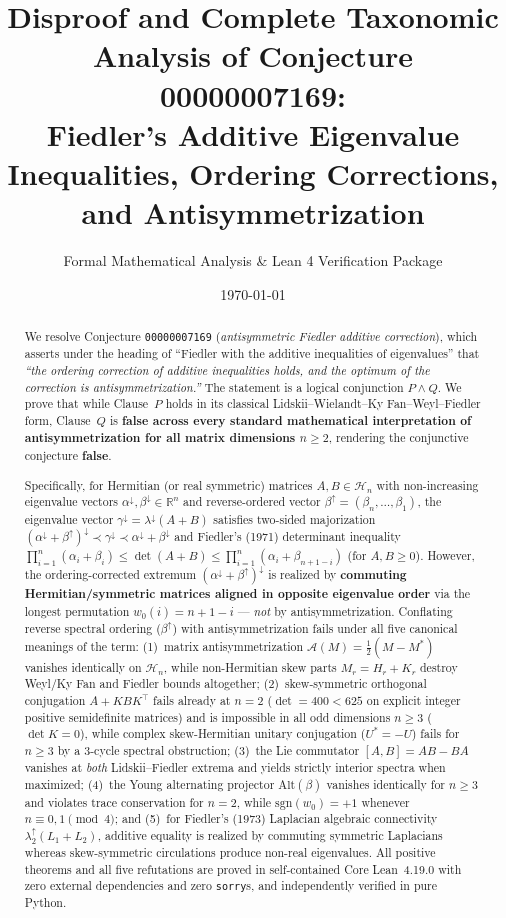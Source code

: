 \documentclass[11pt,a4paper]{article}
\title{\textbf{Disproof and Complete Taxonomic Analysis of Conjecture 00000007169:\\
Fiedler's Additive Eigenvalue Inequalities, Ordering Corrections,\\
and Antisymmetrization}}
\author{Formal Mathematical Analysis \& Lean 4 Verification Package}
\date{\today}
\theoremstyle{plain}
\theoremstyle{definition}
\newcommand{\R}{\mathbb{R}}
\newcommand{\Herm}{\mathcal{H}}
\newcommand{\Ap}{\mathcal{A}}
\newcommand{\Alt}{\mathrm{Alt}}
\begin{document}
\maketitle

\begin{abstract}
We resolve Conjecture \texttt{00000007169} (\emph{antisymmetric Fiedler additive correction}), which asserts under the heading of ``Fiedler with the additive inequalities of eigenvalues'' that \emph{``the ordering correction of additive inequalities holds, and the optimum of the correction is antisymmetrization.''} The statement is a logical conjunction $P \wedge Q$. We prove that while Clause~$P$ holds in its classical Lidskii--Wielandt--Ky Fan--Weyl--Fiedler form, Clause~$Q$ is \textbf{false across every standard mathematical interpretation of antisymmetrization for all matrix dimensions $n \ge 2$}, rendering the conjunctive conjecture \textbf{false}.

Specifically, for Hermitian (or real symmetric) matrices $A, B \in \Herm_n$ with non-increasing eigenvalue vectors $\alpha^\downarrow, \beta^\downarrow \in \R^n$ and reverse-ordered vector $\beta^\uparrow = (\beta_n, \dots, \beta_1)$, the eigenvalue vector $\gamma^\downarrow = \lambda^\downarrow(A + B)$ satisfies two-sided majorization $(\alpha^\downarrow + \beta^\uparrow)^\downarrow \prec \gamma^\downarrow \prec \alpha^\downarrow + \beta^\downarrow$ and Fiedler's (1971) determinant inequality $\prod_{i=1}^n (\alpha_i + \beta_i) \le \det(A + B) \le \prod_{i=1}^n (\alpha_i + \beta_{n+1-i})$ (for $A, B \ge 0$). However, the ordering-corrected extremum $(\alpha^\downarrow + \beta^\uparrow)^\downarrow$ is realized by \textbf{commuting Hermitian/symmetric matrices aligned in opposite eigenvalue order} via the longest permutation $w_0(i) = n + 1 - i$ --- \emph{not} by antisymmetrization. Conflating reverse spectral ordering ($\beta^\uparrow$) with antisymmetrization fails under all five canonical meanings of the term: (1)~matrix antisymmetrization $\Ap(M) = \frac{1}{2}(M - M^*)$ vanishes identically on $\Herm_n$, while non-Hermitian skew parts $M_r = H_r + K_r$ destroy Weyl/Ky Fan and Fiedler bounds altogether; (2)~skew-symmetric orthogonal conjugation $A + K B K^\top$ fails already at $n = 2$ ($\det = 400 < 625$ on explicit integer positive semidefinite matrices) and is impossible in all odd dimensions $n \ge 3$ ($\det K = 0$), while complex skew-Hermitian unitary conjugation ($U^* = -U$) fails for $n \ge 3$ by a $3$-cycle spectral obstruction; (3)~the Lie commutator $[A, B] = A B - B A$ vanishes at \emph{both} Lidskii--Fiedler extrema and yields strictly interior spectra when maximized; (4)~the Young alternating projector $\Alt(\beta)$ vanishes identically for $n \ge 3$ and violates trace conservation for $n = 2$, while $\mathrm{sgn}(w_0) = +1$ whenever $n \equiv 0, 1 \pmod{4}$; and (5)~for Fiedler's (1973) Laplacian algebraic connectivity $\lambda_2^\uparrow(L_1 + L_2)$, additive equality is realized by commuting symmetric Laplacians whereas skew-symmetric circulations produce non-real eigenvalues. All positive theorems and all five refutations are proved in self-contained Core Lean~4.19.0 with zero external dependencies and zero \texttt{sorry}s, and independently verified in pure Python.
\end{abstract}
\end{document}
